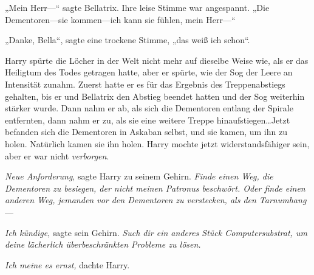 „Mein Herr—“ sagte Bellatrix. Ihre leise Stimme war angespannt. „Die Dementoren—sie kommen—ich kann sie fühlen, mein Herr—“

„Danke, Bella“, sagte eine trockene Stimme, „das weiß ich schon“.

Harry spürte die Löcher in der Welt nicht mehr auf dieselbe Weise wie, als er das Heiligtum des Todes getragen hatte, aber er spürte, wie der Sog der Leere an Intensität zunahm. Zuerst hatte er es für das Ergebnis des Treppenabstiegs gehalten, bis er und Bellatrix den Abstieg beendet hatten und der Sog weiterhin stärker wurde. Dann nahm er ab, als sich die Dementoren entlang der Spirale entfernten, dann nahm er zu, als sie eine weitere Treppe hinaufstiegen…Jetzt befanden sich die Dementoren in Askaban selbst, und sie kamen, um ihn zu holen. Natürlich kamen sie ihn holen. Harry mochte jetzt widerstandsfähiger sein, aber er war nicht \emph{verborgen}.

\emph{Neue Anforderung}, sagte Harry zu seinem Gehirn. \emph{Finde einen Weg, die Dementoren zu besiegen, der nicht meinen Patronus beschwört. Oder finde einen anderen Weg, jemanden vor den Dementoren zu verstecken, als den Tarnumhang}—

\emph{Ich kündige}, sagte sein Gehirn. \emph{Such dir ein anderes Stück Computersubstrat, um deine lächerlich überbeschränkten Probleme zu lösen.}

\emph{Ich meine es ernst,} dachte Harry.

